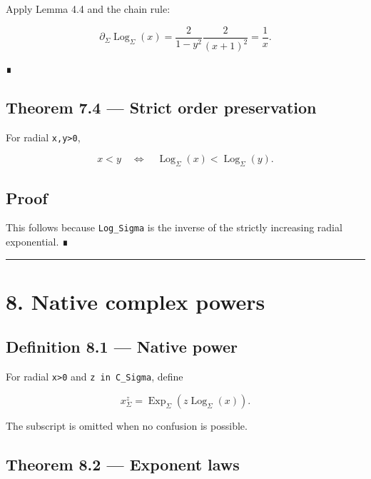 Apply Lemma 4.4 and the chain rule:

\[
\partial_\Sigma\operatorname{Log}_\Sigma(x)
=
\frac{2}{1-y^2}
\frac{2}{(x+1)^2}
=
\frac1x.
\]

∎

\hypertarget{theorem-7.4-strict-order-preservation}{%
\subsection{Theorem 7.4 --- Strict order preservation}\label{theorem-7.4-strict-order-preservation}}

For radial \texttt{x,y\textgreater{}0},

\[
x<y
\quad\Longleftrightarrow\quad
\operatorname{Log}_\Sigma(x)
<
\operatorname{Log}_\Sigma(y).
\]

\hypertarget{proof-10}{%
\subsection{Proof}\label{proof-10}}

This follows because \texttt{Log\_Sigma} is the inverse of the strictly increasing
radial exponential. ∎

\begin{center}\rule{0.5\linewidth}{0.5pt}\end{center}

\hypertarget{native-complex-powers}{%
\section{8. Native complex powers}\label{native-complex-powers}}

\hypertarget{definition-8.1-native-power}{%
\subsection{Definition 8.1 --- Native power}\label{definition-8.1-native-power}}

For radial \texttt{x\textgreater{}0} and \texttt{z\ in\ C\_Sigma}, define

\[
\boxed{
x^z_\Sigma
=
\operatorname{Exp}_\Sigma
(z\operatorname{Log}_\Sigma(x)).
}
\]

The subscript is omitted when no confusion is possible.

\hypertarget{theorem-8.2-exponent-laws}{%
\subsection{Theorem 8.2 --- Exponent laws}\label{theorem-8.2-exponent-laws}}

